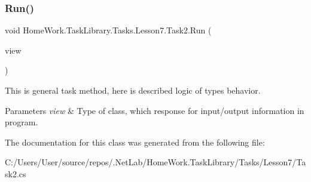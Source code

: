 \subsubsection{\texorpdfstring{Run()}{Run()}}
{\footnotesize\ttfamily void Home\+Work.\+Task\+Library.\+Tasks.\+Lesson7.\+Task2.\+Run (\begin{DoxyParamCaption}\item[{I\+Information}]{view }\end{DoxyParamCaption})}



This is general task method, here is described logic of types behavior. 


\begin{DoxyParams}{Parameters}
{\em view} & Type of class, which response for input/output information in program.\\
\hline
\end{DoxyParams}


The documentation for this class was generated from the following file\+:\begin{DoxyCompactItemize}
\item 
C\+:/\+Users/\+User/source/repos/.\+Net\+Lab/\+Home\+Work.\+Task\+Library/\+Tasks/\+Lesson7/Task2.\+cs\end{DoxyCompactItemize}
